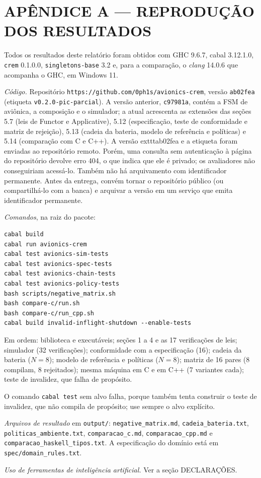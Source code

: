 \documentclass[12pt,a4paper]{article}
\begin{document}
\newpage
\section*{APÊNDICE A --- REPRODUÇÃO DOS RESULTADOS}

Todos os resultados deste relatório foram obtidos com GHC 9.6.7, cabal 3.12.1.0, \texttt{crem} 0.1.0.0, \texttt{singletons-base} 3.2 e, para a comparação, o \textit{clang} 14.0.6 que acompanha o GHC, em Windows 11.

\textit{Código.} Repositório \texttt{https://github.com/0ph1s/avionics-crem}, versão \texttt{ab02fea} (etiqueta \texttt{v0.2.0-pic-parcial}). A versão anterior, \texttt{c97981a}, contém a FSM de aviônica, a composição e o simulador; a atual acrescenta as extensões das seções 5.7 (leis de Functor e Applicative), 5.12 (especificação, teste de conformidade e matriz de rejeição), 5.13 (cadeia da bateria, modelo de referência e políticas) e 5.14 (comparação com C e C++). A versão 	exttt{ab02fea} e a etiqueta foram enviadas ao repositório remoto. Porém, uma consulta sem autenticação à página do repositório devolve erro 404, o que indica que ele é privado; os avaliadores não conseguiriam acessá-lo. Também não há arquivamento com identificador permanente. Antes da entrega, convém tornar o repositório público (ou compartilhá-lo com a banca) e arquivar a versão em um serviço que emita identificador permanente.

\textit{Comandos}, na raiz do pacote:

{\footnotesize
\begin{verbatim}
cabal build
cabal run avionics-crem
cabal test avionics-sim-tests
cabal test avionics-spec-tests
cabal test avionics-chain-tests
cabal test avionics-policy-tests
bash scripts/negative_matrix.sh
bash compare-c/run.sh
bash compare-c/run_cpp.sh
cabal build invalid-inflight-shutdown --enable-tests
\end{verbatim}
}

Em ordem: biblioteca e executáveis; seções 1 a 4 e as 17 verificações de leis; simulador (32 verificações); conformidade com a especificação (16); cadeia da bateria ($N = 8$); modelo de referência e políticas ($N = 8$); matriz de 16 pares (8 compilam, 8 rejeitados); mesma máquina em C e em C++ (7 variantes cada); teste de invalidez, que falha de propósito.

O comando \texttt{cabal test} sem alvo falha, porque também tenta construir o teste de invalidez, que não compila de propósito; use sempre o alvo explícito.

\textit{Arquivos de resultado} em \texttt{output/}: \texttt{negative\_matrix.md}, \texttt{cadeia\_bateria.txt}, \texttt{politicas\_ambiente.txt}, \texttt{comparacao\_c.md}, \texttt{comparacao\_cpp.md} e \texttt{comparacao\_haskell\_tipos.txt}. A especificação do domínio está em \texttt{spec/domain\_rules.txt}.

\textit{Uso de ferramentas de inteligência artificial.} Ver a seção DECLARAÇÕES.
\end{document}

